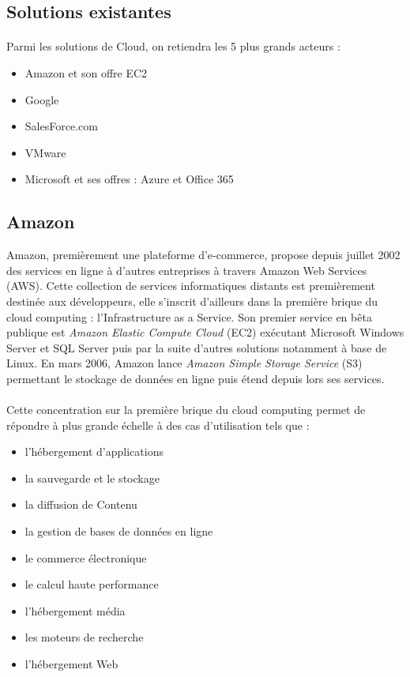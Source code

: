 \documentclass[a4paper,12pt]{report}
\begin{document}
\begin{onehalfspace}
	
	\section{Solutions existantes}
	
	\paragraph*{}
	Parmi les solutions de Cloud, on retiendra les 5 plus grands acteurs : 
	\begin{itemize}
		\item Amazon et son offre EC2
		\item Google
		\item SalesForce.com
		\item VMware
		\item Microsoft et ses offres : Azure et Office 365
	\end{itemize}
	
	
	\subsection{Amazon}
Amazon, premièrement une plateforme d'e-commerce, propose depuis juillet 2002 des services en ligne à d'autres entreprises à travers Amazon Web Services (AWS). Cette collection de services informatiques distants est premièrement destinée aux développeurs, elle s'inscrit d'ailleurs dans la première brique du cloud computing : l'Infrastructure as a Service. Son premier service en bêta publique est \textit{Amazon Elastic Compute Cloud} (EC2) exécutant Microsoft Windows Server et SQL Server puis par la suite d'autres solutions notamment à base de Linux.
 En mars 2006, Amazon lance \textit{Amazon Simple Storage Service} (S3) permettant le stockage de données en ligne puis étend depuis lors ses services.
	
	\paragraph*{}
	Cette concentration sur la première brique du cloud computing permet de répondre à plus grande échelle à des cas d'utilisation tels que :
\begin{itemize}
\item l'hébergement d'applications
\item la sauvegarde et le stockage
\item la diffusion de Contenu
\item la gestion de bases de données en ligne
\item le commerce électronique
\item le calcul haute performance
\item l'hébergement média
\item les moteurs de recherche
\item l'hébergement Web
\end{itemize}


\end{onehalfspace}
\end{document}
